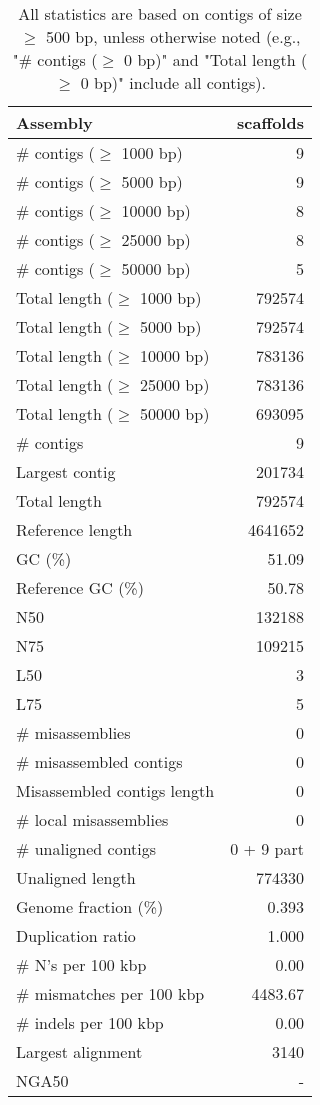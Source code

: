 \documentclass[12pt,a4paper]{article}
\begin{document}
\begin{table}[ht]
\begin{center}
\caption{All statistics are based on contigs of size $\geq$ 500 bp, unless otherwise noted (e.g., "\# contigs ($\geq$ 0 bp)" and "Total length ($\geq$ 0 bp)" include all contigs).}
\begin{tabular}{|l*{1}{|r}|}
\hline
Assembly & scaffolds \\ \hline
\# contigs ($\geq$ 1000 bp) & 9 \\ \hline
\# contigs ($\geq$ 5000 bp) & 9 \\ \hline
\# contigs ($\geq$ 10000 bp) & 8 \\ \hline
\# contigs ($\geq$ 25000 bp) & 8 \\ \hline
\# contigs ($\geq$ 50000 bp) & 5 \\ \hline
Total length ($\geq$ 1000 bp) & 792574 \\ \hline
Total length ($\geq$ 5000 bp) & 792574 \\ \hline
Total length ($\geq$ 10000 bp) & 783136 \\ \hline
Total length ($\geq$ 25000 bp) & 783136 \\ \hline
Total length ($\geq$ 50000 bp) & 693095 \\ \hline
\# contigs & 9 \\ \hline
Largest contig & 201734 \\ \hline
Total length & 792574 \\ \hline
Reference length & 4641652 \\ \hline
GC (\%) & 51.09 \\ \hline
Reference GC (\%) & 50.78 \\ \hline
N50 & 132188 \\ \hline
N75 & 109215 \\ \hline
L50 & 3 \\ \hline
L75 & 5 \\ \hline
\# misassemblies & 0 \\ \hline
\# misassembled contigs & 0 \\ \hline
Misassembled contigs length & 0 \\ \hline
\# local misassemblies & 0 \\ \hline
\# unaligned contigs & 0 + 9 part \\ \hline
Unaligned length & 774330 \\ \hline
Genome fraction (\%) & 0.393 \\ \hline
Duplication ratio & 1.000 \\ \hline
\# N's per 100 kbp & 0.00 \\ \hline
\# mismatches per 100 kbp & 4483.67 \\ \hline
\# indels per 100 kbp & 0.00 \\ \hline
Largest alignment & 3140 \\ \hline
NGA50 & - \\ \hline
\end{tabular}
\end{center}
\end{table}
\end{document}
